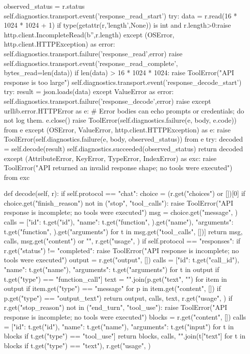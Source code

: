                 observed_status = r.status
                self.diagnostics.transport.event('response_read_start')
                try:
                    data = r.read(16 * 1024 * 1024 + 1)
                    if type(getattr(r,'length',None)) is int and r.length>0:raise http.client.IncompleteRead(b'',r.length)
                except (OSError, http.client.HTTPException) as error:
                    self.diagnostics.transport.failure('response_read',error)
                    raise
                self.diagnostics.transport.event('response_read_complete', bytes_read=len(data))
            if len(data) > 16 * 1024 * 1024:
                raise ToolError("API response is too large")
            self.diagnostics.transport.event('response_decode_start')
            try:
                result = json.loads(data)
            except ValueError as error:
                self.diagnostics.transport.failure('response_decode',error)
                raise
        except urllib.error.HTTPError as e:
            # Error bodies can echo prompts or credentials; do not log them.
            e.close()
            raise ToolError(self.diagnostics.failure(e, body, e.code)) from e
        except (OSError, ValueError, http.client.HTTPException) as e:
            raise ToolError(self.diagnostics.failure(e, body, observed_status)) from e
        try:
            decoded = self.decode(result)
            self.diagnostics.succeeded(observed_status)
            return decoded
        except (AttributeError, KeyError, TypeError, IndexError) as exc:
            raise ToolError("API returned an invalid response shape; no tools were executed") from exc

    def decode(self, r):
        if self.protocol == "chat":
            choice = (r.get("choices") or [{}])[0]
            if choice.get("finish_reason") not in ("stop", "tool_calls"):
                raise ToolError("API response is incomplete; no tools were executed")
            msg = choice.get("message", {})
            calls = [{"id": t.get("id"), "name": t.get("function", {}).get("name"),
                "arguments": t.get("function", {}).get("arguments")} for t in msg.get("tool_calls", [])]
            return msg, calls, msg.get("content") or "", r.get("usage", {})
        if self.protocol == "responses":
            if r.get("status") != "completed":
                raise ToolError("API response is incomplete; no tools were executed")
            output = r.get("output", [])
            calls = [{"id": t.get("call_id"), "name": t.get("name"), "arguments": t.get("arguments")}
                for t in output if t.get("type") == "function_call"]
            text = "\n".join(p.get("text", "") for item in output if item.get("type") == "message"
                for p in item.get("content", []) if p.get("type") == "output_text")
            return output, calls, text, r.get("usage", {})
        if r.get("stop_reason") not in ("end_turn", "tool_use"):
            raise ToolError("API response is incomplete; no tools were executed")
        blocks = r.get("content", [])
        calls = [{"id": t.get("id"), "name": t.get("name"), "arguments": t.get("input")}
            for t in blocks if t.get("type") == "tool_use"]
        return blocks, calls, "\n".join(t["text"] for t in blocks if t.get("type") == "text"), r.get("usage", {})


